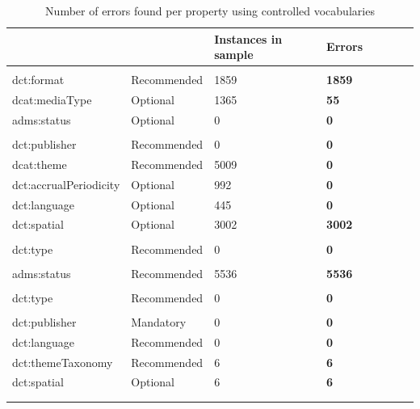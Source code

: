 \documentclass[<options>]{elsarticle}
\begin{document}
\begin{longtable}{*8l}
\rowcolor{gray!10}{\textbf{Property}} & {} & {\textbf{Instances in sample}} & {\textbf{Errors}} \\ \hline
\rowcolor{gray!10}{Distribution} & {} & {} & {} \\ \hline
\rowcolor{orange!20} dct:format &Recommended &1859 &\textbf{1859} \\ \hline
\rowcolor{orange!20} dcat:mediaType &Optional &1365 &\textbf{55} \\ \hline
\rowcolor{white!10} adms:status &Optional &0 &\textbf{0} \\ \hline
\rowcolor{gray!10}{Dataset} & {} & {} & {} \\ \hline
\rowcolor{white!10} dct:publisher &Recommended &0 &\textbf{0} \\ \hline
\rowcolor{white!10} dcat:theme &Recommended &5009 &\textbf{0} \\ \hline
\rowcolor{white!10} dct:accrualPeriodicity &Optional &992 &\textbf{0} \\ \hline
\rowcolor{white!10} dct:language &Optional &445 &\textbf{0} \\ \hline
\rowcolor{orange!20} dct:spatial &Optional &3002 &\textbf{3002} \\ \hline
\rowcolor{gray!10}{Agent} & {} & {} & {} \\ \hline
\rowcolor{white!10} dct:type &Recommended &0 &\textbf{0} \\ \hline
\rowcolor{gray!10}{CatalogRecord} & {} & {} & {} \\ \hline
\rowcolor{orange!20} adms:status &Recommended &5536 &\textbf{5536} \\ \hline
\rowcolor{gray!10}{LicenseDocument} & {} & {} & {} \\ \hline
\rowcolor{white!10} dct:type &Recommended &0 &\textbf{0} \\ \hline
\rowcolor{gray!10}{Catalog} & {} & {} & {} \\ \hline
\rowcolor{white!10} dct:publisher &Mandatory &0 &\textbf{0} \\ \hline
\rowcolor{white!10} dct:language &Recommended &0 &\textbf{0} \\ \hline
\rowcolor{orange!20} dct:themeTaxonomy &Recommended &6 &\textbf{6} \\ \hline
\rowcolor{orange!20} dct:spatial &Optional &6 &\textbf{6} \\ \hline
\\
\caption{Number of errors found per property using controlled vocabularies }
\end{longtable}
\end{document}
